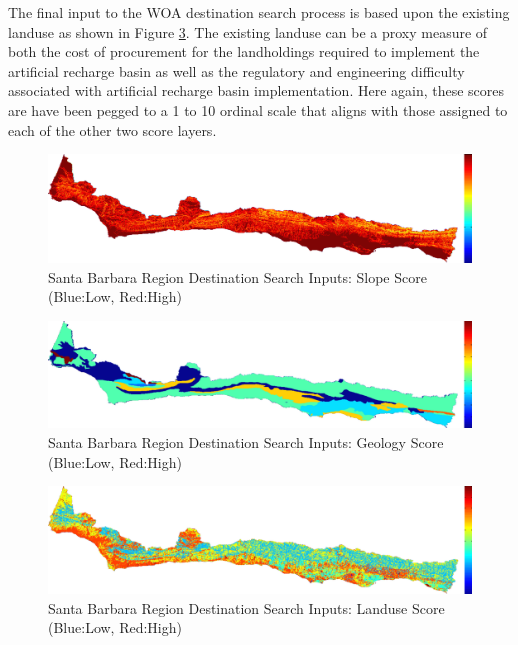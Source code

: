 The final input to the WOA destination search process is based upon the existing landuse as shown in Figure \ref{fig:SBdsinputs_landuse}. The existing landuse can be a proxy measure of both the cost of procurement for the landholdings required to implement the artificial recharge basin as well as the regulatory and engineering difficulty associated with artificial recharge basin implementation. Here again, these scores are have been pegged to a 1 to 10 ordinal scale that aligns with those assigned to each of the other two score layers. 

        \begin{figure}[!h]
            \begin{center}
            \includegraphics[width=5.5in]{figures/SantaBarbara_Search_Slope.png}   
            \caption{Santa Barbara Region Destination Search Inputs: Slope Score (Blue:Low, Red:High)}
            \label{fig:SBdsinputs_slope}
            \end{center}
        \end{figure}
        
        \begin{figure}[!h]
            \begin{center}
            \includegraphics[width=5.5in]{figures/SantaBarbara_Search_Geology.png}   
            \caption{Santa Barbara Region Destination Search Inputs: Geology Score (Blue:Low, Red:High)}
            \label{fig:SBdsinputs_geology}
            \end{center}
        \end{figure}
    
        \begin{figure}[!h]
            \begin{center}
            \includegraphics[width=5.5in]{figures/SantaBarbara_Search_Landuse.png}   
            \caption{Santa Barbara Region Destination Search Inputs: Landuse Score (Blue:Low, Red:High)}
            \label{fig:SBdsinputs_landuse}
            \end{center}
        \end{figure}
    
